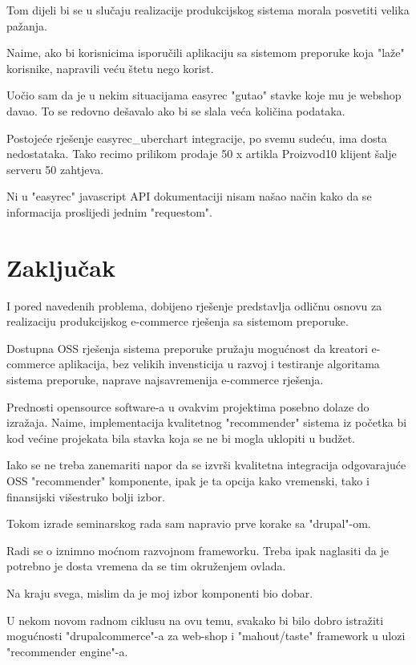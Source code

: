 \documentclass[times, utf8, seminar]{fit}
\begin{document}
{{Tom dijeli bi se u slučaju realizacije produkcijskog sistema morala posvetiti velika pažanja.

Naime, ako bi korisnicima isporučili aplikaciju sa sistemom preporuke koja "laže" korisnike, napravili veću štetu nego korist.

Uočio sam da je u nekim situacijama easyrec "gutao" stavke koje mu je webshop davao. To se redovno dešavalo ako bi se slala veća količina podataka. 

Postojeće rješenje easyrec\_uberchart integracije, po svemu sudeću, ima dosta nedostataka. Tako recimo prilikom prodaje 50 x artikla Proizvod10 klijent šalje serveru 50 zahtjeva.

Ni u "easyrec" javascript API dokumentaciji nisam našao način kako da se informacija proslijedi jednim "requestom".

\chapter{Zaključak}

I pored navedenih problema, dobijeno rješenje predstavlja odličnu osnovu za realizaciju produkcijskog e-commerce rješenja sa sistemom preporuke.

Dostupna OSS rješenja sistema preporuke pružaju mogućnost da kreatori e-commerce aplikacija, bez velikih invensticija u razvoj i testiranje algoritama sistema preporuke, naprave najsavremenija e-commerce rješenja.

Prednosti opensource software-a u ovakvim projektima posebno dolaze do izražaja. 
Naime, implementacija kvalitetnog "recommender" sistema iz početka bi kod većine projekata bila stavka koja se ne bi mogla uklopiti u budžet.

Iako se ne treba zanemariti napor da se izvrši kvalitetna integracija odgovarajuće OSS "recommender" komponente, ipak je ta opcija kako vremenski, tako i finansijski višestruko bolji izbor.

Tokom izrade seminarskog rada sam napravio prve korake sa "drupal"-om. 

Radi se o iznimno moćnom razvojnom frameworku. Treba ipak naglasiti da je potrebno je dosta vremena da se tim okruženjem ovlada.

Na kraju svega, mislim da je moj izbor komponenti bio dobar.

U nekom novom radnom ciklusu na ovu temu, svakako bi bilo dobro istražiti mogućnosti "drupalcommerce"-a za web-shop i "mahout/taste" framework u ulozi "recommender engine"-a.

}}
\end{document}
